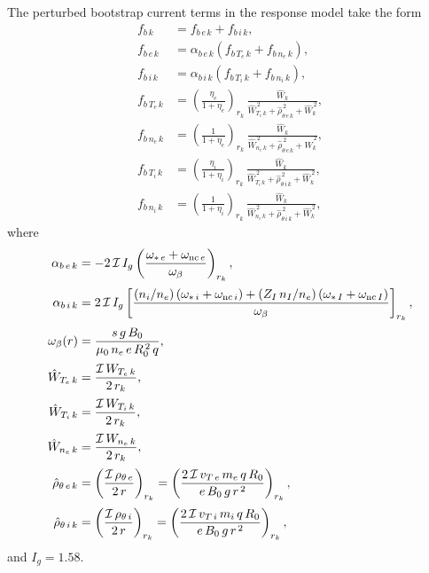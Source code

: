 \documentclass[12pt,prb,aps]{revtex4-1}
\begin{document}
The perturbed bootstrap current terms in the response model take the form
\begin{align}
f_{b\,k} &= f_{b\,e\,k}+f_{b\,i\,k},\\[0.5ex]
f_{b\,e\,k} &= \alpha_{b\,e\,k}\left(f_{b\,T_e\,k} + f_{b\,n_e\,k}\right),\\[0.5ex]
f_{b\,i\,k} &= \alpha_{b\,i\,k}\left(f_{b\,T_i\,k} + f_{b\,n_i\,k}\right),\\[0.5ex]
f_{b\,T_e\,k}&=\left(\frac{\eta_e}{1+\eta_e}\right)_{r_k}\,\frac{\hat{W}_k}{\hat{W}_{T_e\,k}^{\,2}+\hat{\rho}_{\theta\,e\,k}^{\,2}+\hat{W}_k^{\,2}},\\[0.5ex]
f_{b\,n_e\,k}&=\left(\frac{1}{1+\eta_e}\right)_{r_k}\,\frac{\hat{W}_k}{\hat{W}_{n_e\,k}^{\,2}+\hat{\rho}_{\theta\,e\,k}^{\,2}+\hat{W}_k^{\,2}},\\[0.5ex]
f_{b\,T_i\,k}&=\left(\frac{\eta_i}{1+\eta_i}\right)_{r_k}\,\frac{\hat{W}_k}{\hat{W}_{T_i\,k}^{\,2}+\hat{\rho}_{\theta\,i\,k}^{\,2}+\hat{W}_k^{\,2}},\\[0.5ex]
f_{b\,n_i\,k}&=\left(\frac{1}{1+\eta_i}\right)_{r_k}\,\frac{\hat{W}_k}{\hat{W}_{n_e\,k}^{\,2}+\hat{\rho}_{\theta\,i\,k}^{\,2}+\hat{W}_k^{\,2}},
\end{align}
where
\begin{align}
\alpha_{b\,e\,k} &= -2\,{\cal I}\,I_g\left(\frac{\omega_{\ast\,e}+\omega_{{\rm nc}\,e}}{\omega_\beta}\right)_{r_k},\\[0.5ex]
\alpha_{b\,i\,k} &= 2\,{\cal I}\,I_g\left[\frac{(n_i/n_e)\left(\omega_{\ast\,i}+\omega_{{\rm nc}\,i}\right)+(Z_I\,n_I/n_e)\left(\omega_{\ast\,I}+\omega_{{\rm nc}\,I}\right)}{\omega_\beta}\right]_{r_k},\\[0.5ex]
\omega_{\beta}(r)&= \frac{s\,g\,B_0}{\mu_0\,n_e\,e\,R_0^{\,2}\,q},\\[0.5ex]
\hat{W}_{T_e\,k} &=\frac{{\cal I}\,W_{T_e\,k}}{2\,r_k} ,\\[0.5ex]
\hat{W}_{T_i\,k} &= \frac{{\cal I}\,W_{T_i\,k}}{2\,r_k},\\[0.5ex]
\hat{W}_{n_e\,k} &= \frac{{\cal I}\,W_{n_e\,k}}{2\,r_k},\\[0.5ex]
\hat{\rho}_{\theta\,e\, k} &= \left(\frac{{\cal I}\,\rho_{\theta\,e}}{2\,r}\right)_{r_k}=\left(\frac{2\,{\cal I}\,v_{T\,e}\,m_e\,q\,R_0}{e\,B_0\,g\,r^{\,2}}\right)_{r_k},\\[0.5ex]
\hat{\rho}_{\theta\,i\,k} &= \left(\frac{{\cal I}\,\rho_{\theta\,i}}{2\,r}\right)_{r_k}= \left(\frac{2\,{\cal I}\,v_{T\,i}\,m_i\,q\,R_0}{e\,B_0\,g\,r^{\,2}}\right)_{r_k},
\end{align}
and $I_g = 1.58$.
\end{document}

